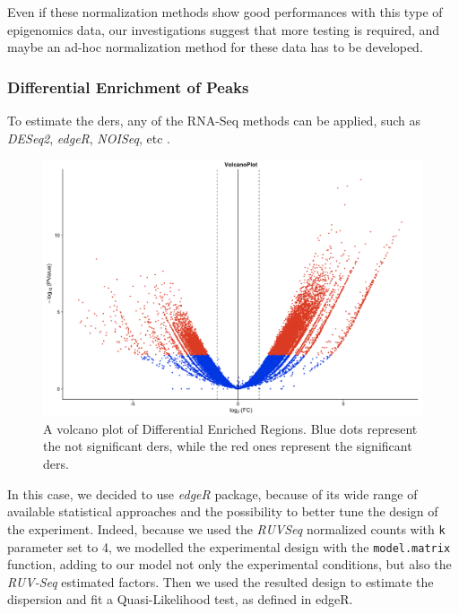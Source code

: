 Even if these normalization methods show good performances with this type of epigenomics data, our investigations suggest that more testing is required, and maybe an ad-hoc normalization method for these data has to be developed.

\subsubsection{Differential Enrichment of Peaks}

To estimate the \glspl{der}, any of the RNA-Seq methods can be applied, such as \textit{DESeq2}, \textit{edgeR}, \textit{NOISeq}, etc \cite{Robinson2009, McCarthy2012, Tarazona2011, Tarazona2015}.

\begin{figure}[H]
\centering
\includegraphics[width=\textwidth, keepaspectratio]{img/descan2/DE_peaks.png}
\caption[Differential Enrichment Regions Volcano]{A volcano plot of Differential Enriched Regions. Blue dots represent the not significant \glspl{der}, while the red ones represent the significant \glspl{der}.}
\label{fig:depeaksdescan}
\centering
\end{figure}

In this case, we decided to use \textit{edgeR} package, because of its wide range of  available statistical approaches and the possibility to better tune the design of the experiment. 
Indeed, because we used the \textit{RUVSeq} normalized counts with \lstinline!k! parameter set to 4, we modelled the experimental design with the \lstinline!model.matrix! function, adding to our model not only the experimental conditions, but also the \textit{RUV-Seq} estimated factors.
Then we used the resulted design to estimate the dispersion and fit a Quasi-Likelihood test, as defined in edgeR\cite{Robinson2009}.
 
